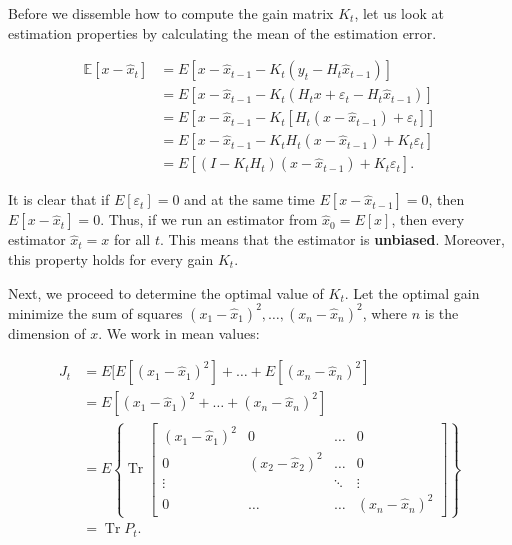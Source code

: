 Before we dissemble how to compute the gain matrix \(K_t\), let us look at estimation properties by calculating the mean of the estimation error.

\begin{equation*}
\begin{aligned}
\mathbb{E}[x-\hat{x}_{t}] 
&= E[x-\hat{x}_{t-1} - K_t(y_t - H_t \hat{x}_{t-1})] \\ 
&= E[x-\hat{x}_{t-1} - K_t(H_t x + \varepsilon_t - H_t \hat{x}_{t-1})] \\ 
&= E\left[x-\hat{x}_{t-1} - K_t[H_t (x - \hat{x}_{t-1}) + \varepsilon_t]\right] \\ 
&= E\left[x-\hat{x}_{t-1} - K_t H_t (x - \hat{x}_{t-1}) + K_t \varepsilon_t \right] \\ 
&= E\left[(I - K_t H_t)(x - \hat{x}_{t-1}) + K_t \varepsilon_t \right].
\end{aligned}
\end{equation*}

It is clear that if \(E[\varepsilon_t] = 0\) and at the same time \(E[x-\hat{x}_{t-1}]=0\), then \(E[x-\hat{x}_{t}]=0\). Thus, if we run an estimator from \(\hat{x}_0 = E[x]\), then every estimator \(\hat{x}_t = x\) for all \(t\). This means that the estimator is \textbf{unbiased}. Moreover, this property holds for every gain \(K_t\).

Next, we proceed to determine the optimal value of \(K_t\). Let the optimal gain minimize the sum of squares \((x_1-\hat{x}_1)^2,\ldots, (x_n-\hat{x}_n)^2\), where \(n\) is the dimension of \(x\). We work in mean values:

\begin{equation}
\begin{aligned}
J_t 
&= E[E[(x_1-\hat{x}_1)^2] + \ldots + E[(x_n-\hat{x}_n)^2] \\[3mm]
&= E[(x_1-\hat{x}_1)^2 + \ldots + (x_n-\hat{x}_n)^2] \\[3mm]
&=
E \left\{ \operatorname{Tr}
\begin{bmatrix}
(x_1 - \hat{x}_1)^2 & 0 & \ldots & 0 \\
0 & (x_2 - \hat{x}_2)^2 & \ldots & 0 \\
\vdots & & \ddots & \vdots \\
0 &\ldots & \ldots & (x_n - \hat{x}_n)^2
\end{bmatrix}
\right\} \\[3mm]
&= \operatorname{Tr} P_t.
\label{eq:rls_minimise_sum_of_the_variances}
\end{aligned}
\end{equation}

